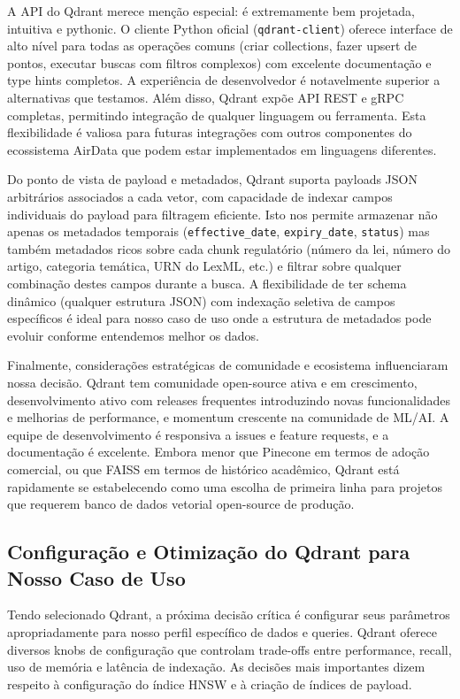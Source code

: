 \documentclass[12pt,a4paper]{article}
\begin{document}
A API do Qdrant merece menção especial: é extremamente bem projetada, intuitiva e pythonic. O cliente Python oficial (\texttt{qdrant-client}) oferece interface de alto nível para todas as operações comuns (criar collections, fazer upsert de pontos, executar buscas com filtros complexos) com excelente documentação e type hints completos. A experiência de desenvolvedor é notavelmente superior a alternativas que testamos. Além disso, Qdrant expõe API REST e gRPC completas, permitindo integração de qualquer linguagem ou ferramenta. Esta flexibilidade é valiosa para futuras integrações com outros componentes do ecossistema AirData que podem estar implementados em linguagens diferentes.

Do ponto de vista de payload e metadados, Qdrant suporta payloads JSON arbitrários associados a cada vetor, com capacidade de indexar campos individuais do payload para filtragem eficiente. Isto nos permite armazenar não apenas os metadados temporais (\texttt{effective\_date}, \texttt{expiry\_date}, \texttt{status}) mas também metadados ricos sobre cada chunk regulatório (número da lei, número do artigo, categoria temática, URN do LexML, etc.) e filtrar sobre qualquer combinação destes campos durante a busca. A flexibilidade de ter schema dinâmico (qualquer estrutura JSON) com indexação seletiva de campos específicos é ideal para nosso caso de uso onde a estrutura de metadados pode evoluir conforme entendemos melhor os dados.

Finalmente, considerações estratégicas de comunidade e ecosistema influenciaram nossa decisão. Qdrant tem comunidade open-source ativa e em crescimento, desenvolvimento ativo com releases frequentes introduzindo novas funcionalidades e melhorias de performance, e momentum crescente na comunidade de ML/AI. A equipe de desenvolvimento é responsiva a issues e feature requests, e a documentação é excelente. Embora menor que Pinecone em termos de adoção comercial, ou que FAISS em termos de histórico acadêmico, Qdrant está rapidamente se estabelecendo como uma escolha de primeira linha para projetos que requerem banco de dados vetorial open-source de produção.

\subsection{Configuração e Otimização do Qdrant para Nosso Caso de Uso}

Tendo selecionado Qdrant, a próxima decisão crítica é configurar seus parâmetros apropriadamente para nosso perfil específico de dados e queries. Qdrant oferece diversos knobs de configuração que controlam trade-offs entre performance, recall, uso de memória e latência de indexação. As decisões mais importantes dizem respeito à configuração do índice HNSW e à criação de índices de payload.
\end{document}
